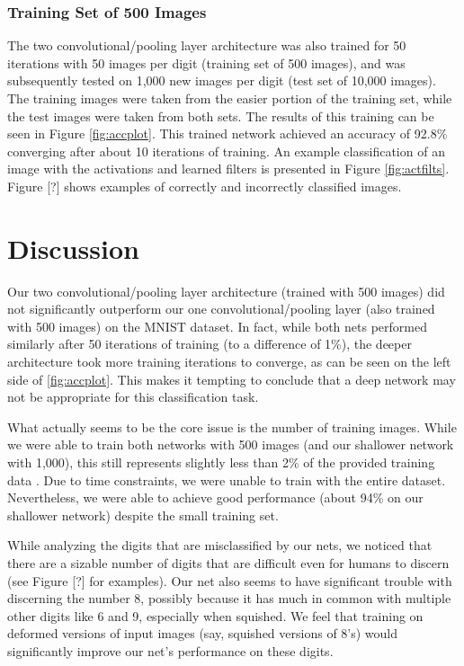 \documentclass[10pt,twocolumn,letterpaper]{article}
\begin{document}
\subsubsection{Training Set of 500 Images}

The two convolutional/pooling layer architecture was also trained for 50 iterations with 50 images per digit
(training set of 500 images), and was subsequently tested on 1,000 new images per digit
(test set of 10,000 images).
The training images were taken from the easier portion of the training set,
while the test images were taken from both sets.
The results of this training can be seen in Figure \ref{fig:accplot}. This trained network achieved an accuracy of 92.8\% converging after about 10 iterations of training.
An example 
classification of an image with the activations and learned filters is presented
in Figure \ref{fig:actfilts}.
Figure [?] shows examples of correctly and incorrectly classified images.

\section{Discussion}

Our two convolutional/pooling layer architecture (trained with 500 images) did not significantly outperform
our one convolutional/pooling layer (also trained with 500 images) on the MNIST dataset. In fact, while both nets
performed similarly after 50 iterations of training (to a difference of 1\%), the deeper architecture took more
training iterations to converge, as can be seen on the left side of \ref{fig:accplot}.
This makes it tempting to conclude that a deep network may not be appropriate for this classification task.

What actually seems to be the core issue is the number of training images. While we were able to train both
networks with 500 images (and our shallower network with 1,000), this still represents slightly less than 2\% of
the provided training data \cite{MNIST}. Due to time constraints, we were unable to train with the entire dataset.
Nevertheless, we were able to achieve good performance (about 94\% on our shallower network) despite the small
training set.

While analyzing the digits that are misclassified by our nets, we noticed that there are a sizable number of
digits that are difficult even for humans to discern (see Figure [?] for examples). Our net also seems to have
significant trouble with discerning the number 8, possibly because it has much in common with multiple other
digits like 6 and 9, especially when squished. We feel that training on deformed versions of input images
(say, squished versions of 8's) would significantly improve our net's performance on these digits.
\end{document}
